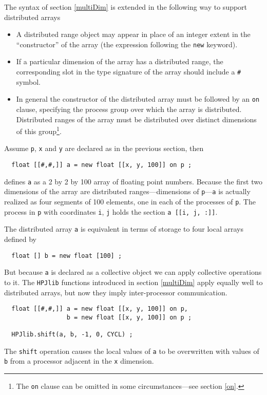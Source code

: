 The syntax of section \ref{multiDim} is extended in the following way
to support distributed arrays
\begin{itemize}
\item
A distributed range object may appear in place of an integer extent in the
``constructor'' of the array (the expression following the {\tt new}
keyword).
\item
If a particular dimension of the array has a distributed range, the
corresponding slot in the type signature of the array should include
a {\tt \#} symbol.
\item
In general the constructor of the distributed
array must be followed by an {\tt on} clause, specifying the process
group over which the array is distributed.  Distributed ranges
of the array must be distributed over distinct dimensions of this
group\footnote{The {\tt on} clause can be omitted in some circumstances---see
section \ref{on}.}.
\end{itemize}
Assume {\tt p},
{\tt x} and {\tt y} are declared as in the previous section, then
\small
\begin{verbatim}
  float [[#,#,]] a = new float [[x, y, 100]] on p ;
\end{verbatim}
\normalsize
defines {\tt a} as a 2 by 2 by 100 array of floating point
numbers.  Because the first two dimensions of the array are distributed
ranges---dimensions of {\tt p}---{\tt a} is actually realized as four
segments of 100 elements, one in each of the processes of {\tt p}.
The process in {\tt p} with coordinates {\tt i}, {\tt j}
holds the section {\tt a [[i, j, :]]}.

The distributed array {\tt a} is equivalent in terms of storage
to four local arrays defined by
\small
\begin{verbatim}
  float [] b = new float [100] ;
\end{verbatim}
\normalsize
But because {\tt a} is declared as a collective object we can apply
collective operations to it.  The {\tt HPJlib} functions introduced in
section \ref{multiDim} apply equally well to distributed arrays, but
now they imply inter-processor communication.
\small
\begin{verbatim}
  float [[#,#,]] a = new float [[x, y, 100]] on p,
                 b = new float [[x, y, 100]] on p ;

  HPJlib.shift(a, b, -1, 0, CYCL) ;
\end{verbatim}
\normalsize
The {\tt shift} operation causes the local values of {\tt a} to be overwritten
with values of {\tt b} from a processor adjacent in the {\tt x} dimension.

